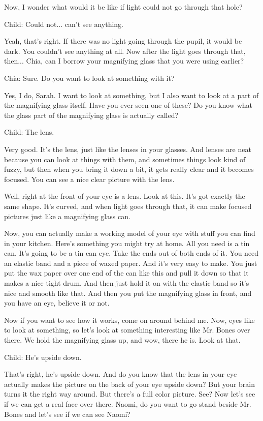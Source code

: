 Now, I wonder what would it be like if light could not go through that hole?

Child: Could not... can't see anything.

Yeah, that's right. If there was no light going through the pupil, it would be dark. You couldn't see anything at all. Now after the light goes through that, then... Chia, can I borrow your magnifying glass that you were using earlier?

Chia: Sure. Do you want to look at something with it?

Yes, I do, Sarah. I want to look at something, but I also want to look at a part of the magnifying glass itself. Have you ever seen one of these? Do you know what the glass part of the magnifying glass is actually called?

Child: The lens.

Very good. It's the lens, just like the lenses in your glasses. And lenses are neat because you can look at things with them, and sometimes things look kind of fuzzy, but then when you bring it down a bit, it gets really clear and it becomes focused. You can see a nice clear picture with the lens.

Well, right at the front of your eye is a lens. Look at this. It's got exactly the same shape. It's curved, and when light goes through that, it can make focused pictures just like a magnifying glass can.

Now, you can actually make a working model of your eye with stuff you can find in your kitchen. Here's something you might try at home. All you need is a tin can. It's going to be a tin can eye. Take the ends out of both ends of it. You need an elastic band and a piece of waxed paper. And it's very easy to make. You just put the wax paper over one end of the can like this and pull it down so that it makes a nice tight drum. And then just hold it on with the elastic band so it's nice and smooth like that. And then you put the magnifying glass in front, and you have an eye, believe it or not.

Now if you want to see how it works, come on around behind me. Now, eyes like to look at something, so let's look at something interesting like Mr. Bones over there. We hold the magnifying glass up, and wow, there he is. Look at that.

Child: He's upside down.

That's right, he's upside down. And do you know that the lens in your eye actually makes the picture on the back of your eye upside down? But your brain turns it the right way around. But there's a full color picture. See? Now let's see if we can get a real face over there. Naomi, do you want to go stand beside Mr. Bones and let's see if we can see Naomi?

